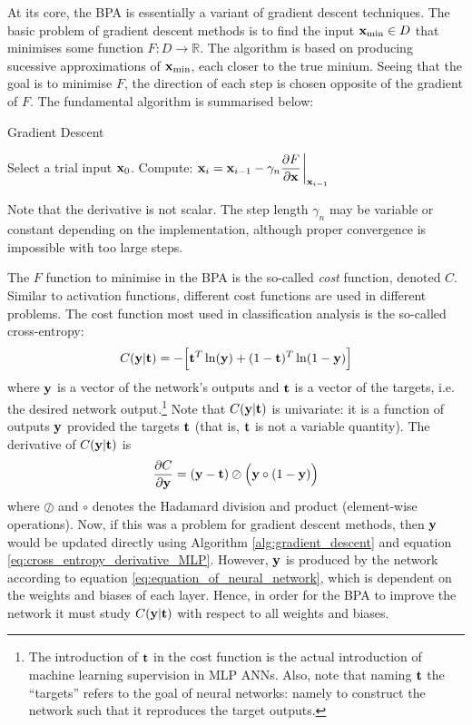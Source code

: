\documentclass[nofootinbib,reprint,english]{revtex4-1}
\begin{document}
At its core, the BPA is essentially a variant of gradient descent techniques. The basic problem of gradient descent methods is to find the input \(\vb{x}_\text{min}\in D\) that minimises some function \(F:D\to\mathbb{R}\). The algorithm is based on producing sucessive approximations of \(\vb{x}_\text{min}\), each closer to the true minium. Seeing that the goal is to minimise \(F\), the direction of each step is chosen opposite of the gradient of \(F\). The fundamental algorithm is summarised below:
\begin{algorithm}[H]
\caption{Gradient Descent}\label{alg:gradient_descent}
\begin{algorithmic}[1]
\State Select a trial input \(\vb{x}_0\).
	\State Compute: \(\displaystyle\vb{x}_i=\vb{x}_{i-1}-\gamma_n\pdv{F}{\vb{x}}\eval_{\vb{x}_{i-1}}\)
\EndFor
\end{algorithmic}
\end{algorithm}
\noindent Note that the derivative is not scalar. The step length \(\gamma_n\) may be variable or constant depending on the implementation, although proper convergence is impossible with too large steps.

The \(F\) function to minimise in the BPA is the so-called \emph{cost} function, denoted \(C\). Similar to activation functions, different cost functions are used in different problems. The cost function most used in classification analysis is the so-called cross-entropy:
\begin{equation}\label{eq:cross_entropy_MLP}
C(\vb{y}|\vb{t})=-\Big[\vb{t}^T\ln(\vb{y})+(1-\vb{t})^T\ln(1-\vb{y})\Big]
\end{equation}
where \(\vb{y}\) is a vector of the network's outputs and \(\vb{t}\) is a vector of the targets, i.e. the desired network output.\footnote{The introduction of \(\vb{t}\) in the cost function is the actual introduction of machine learning supervision in MLP ANNs. Also, note that naming \(\vb{t}\) the ``targets'' refers to the goal of neural networks: namely to construct the network such that it reproduces the target outputs.} Note that \(C(\vb{y}|\vb{t})\) is univariate: it is a function of outputs \(\vb{y}\) provided the targets \(\vb{t}\) (that is, \(\vb{t}\) is not a variable quantity). The derivative of \(C(\vb{y}|\vb{t})\) is
\begin{equation}\label{eq:cross_entropy_derivative_MLP}
\pdv{C}{\vb{y}}=(\vb{y}-\vb{t})\oslash\Big(\vb{y}\circ(1-\vb{y})\Big)
\end{equation}
where \(\oslash\) and \(\circ\) denotes the Hadamard division and product (element-wise operations). Now, if this was a problem for gradient descent methods, then \(\vb{y}\) would be updated directly using Algorithm \ref{alg:gradient_descent} and equation \eqref{eq:cross_entropy_derivative_MLP}. However, \(\vb{y}\) is produced by the network according to equation \eqref{eq:equation_of_neural_network}, which is dependent on the weights and biases of each layer. Hence, in order for the BPA to improve the network it must study \(C(\vb{y}|\vb{t})\) with respect to all weights and biases. 
\end{document}
